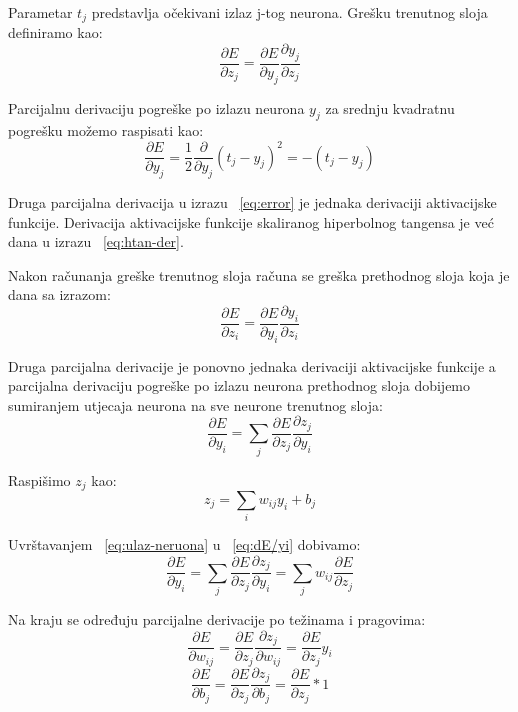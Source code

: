 \documentclass[times, utf8, zavrsni, numeric]{fer}
\begin{document}
Parametar $t_j$ predstavlja očekivani izlaz j-tog neurona. Grešku trenutnog sloja definiramo kao:
\begin{equation}\label{eq:error}
\dfrac{\partial E}{\partial z_j} = \dfrac{\partial E}{\partial y_j} \dfrac{\partial y_j}{\partial z_j}
\end{equation}

Parcijalnu derivaciju pogreške po izlazu neurona $y_j$ za srednju kvadratnu pogrešku možemo raspisati kao:
\begin{equation}\label{eq:sr-kv-pogr-der}
\dfrac{\partial E}{\partial y_j} = \frac{1}{2}\dfrac{\partial}{\partial y_j}(t_j-y_j)^2 = -(t_j - y_j)
\end{equation}

Druga parcijalna derivacija u izrazu ~\ref{eq:error} je jednaka derivaciji aktivacijske funkcije. Derivacija aktivacijske funkcije skaliranog hiperbolnog tangensa je već dana u izrazu ~\ref{eq:htan-der}.

Nakon računanja greške trenutnog sloja računa se greška prethodnog sloja koja je dana sa izrazom:
\begin{equation}\label{eq:error-prethodni}
\dfrac{\partial E}{\partial z_i} = \dfrac{\partial E}{\partial y_i} \dfrac{\partial y_i}{\partial z_i} 
\end{equation}

Druga parcijalna derivacije je ponovno jednaka derivaciji aktivacijske funkcije a parcijalna derivaciju pogreške po izlazu neurona prethodnog sloja dobijemo sumiranjem utjecaja neurona na sve neurone trenutnog sloja:
\begin{equation}\label{eq:dE/yi}
\dfrac{\partial E}{\partial y_i} = \sum_j\dfrac{\partial E}{\partial z_j}\dfrac{\partial z_j}{\partial y_i} 
\end{equation}

Raspišimo $z_j$ kao:
\begin{equation}\label{eq:ulaz-neruona}
z_j = \sum_i w_{ij}y_i + b_j
\end{equation}

Uvrštavanjem ~\ref{eq:ulaz-neruona} u ~\ref{eq:dE/yi} dobivamo:
\begin{equation}\label{eq:dE/yi2}
\dfrac{\partial E}{\partial y_i} = \sum_j\dfrac{\partial E}{\partial z_j}\dfrac{\partial z_j}{\partial y_i} = \sum_j w_{ij}\dfrac{\partial E}{\partial z_j}
\end{equation}

Na kraju se određuju parcijalne derivacije po težinama i pragovima:
\begin{equation}\label{eq:der-w}
\dfrac{\partial E}{\partial w_{ij}} = \dfrac{\partial E}{\partial z_j}\dfrac{\partial z_j}{\partial w_{ij}} = \dfrac{\partial E}{\partial z_j}y_i
\end{equation}
\begin{equation}\label{eq:der-b}
\dfrac{\partial E}{\partial b_j} = \dfrac{\partial E}{\partial z_j}\dfrac{\partial z_j}{\partial b_j} = \dfrac{\partial E}{\partial z_j}*1
\end{equation}
\end{document}
